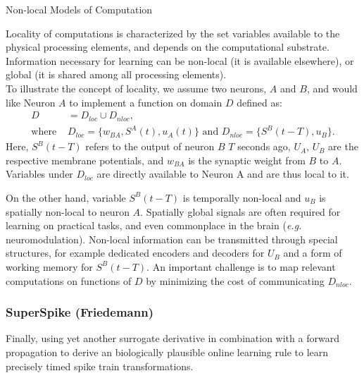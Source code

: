 \documentclass[journal,onecolumn,11pt]{IEEEtran}
\begin{document}
\begin{infobox}
  \begin{mdframed}[backgroundcolor=black!10]\small
    \caption{\label{box:nonlocal} Non-local Models of Computation}
     Locality of computations is characterized by the set variables available to the physical processing elements, and depends on the computational substrate.
    Information necessary for learning can be non-local (it is available elsewhere), or global (it is shared among all processing elements).\\
    To illustrate the concept of locality, we assume two neurons, $A$ and $B$, and would like Neuron $A$ to implement a function on domain $D$ defined as:
    \[ 
      \begin{split}
        D & = D_{loc} \cup D_{nloc},\\
        \text{where } &D_{loc}=\{w_{BA},S^A(t), u_A(t)\}\text{ and }D_{nloc} = \{ S^B(t-T), u_{B}\}.
      \end{split}
    \]
    Here, $S^B(t-T)$ refers to the output of neuron $B$ $T$ seconds ago, $U_A$, $U_B$ are the respective membrane potentials, and $w_{BA}$ is the synaptic weight from $B$ to $A$.  
    Variables under $D_{loc}$ are directly available to Neuron A and are thus local to it. 
      
    On the other hand, variable $S^B(t-T)$ is temporally non-local and $u_{B}$ is spatially non-local to neuron $A$.
    Spatially global signals are often required for learning on practical tasks, and even commonplace in the brain (\emph{e.g.} neuromodulation).
    Non-local information can be transmitted through special structures, for example dedicated encoders and decoders for $U_B$ and a form of working memory for $S^B(t-T)$.
    An important challenge is to map relevant computations on functions of $D$ by minimizing the cost of communicating $D_{nloc}$.
    
  \end{mdframed}
\end{infobox}


\subsubsection{SuperSpike (Friedemann)} 
Finally, \citet{zenke_superspike:_2018} using yet another surrogate derivative in combination with a forward propagation to derive an biologically plausible online
learning rule to learn precisely timed spike train transformations. 
\end{document}
